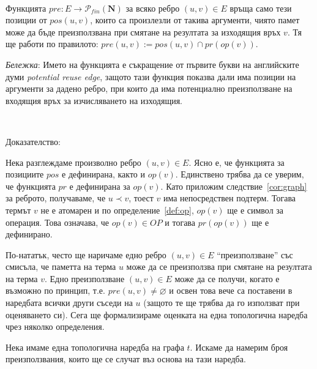 \documentclass[12pt,twoside,a4paper]{article}
\begin{document}
	\begin{definition}\label{def:pre}~\\
		\indent Функцията $pre\colon E \to \mathcal{P}_{fin}(\mathbf{N})$ за всяко ребро $(u,v) \in E$ връща само тези позиции от $pos(u,v)$, които са произлезли от такива аргументи, чиято памет може да бъде преизползвана при смятане на резултата за изходящия връх $v$. Тя ще работи по правилото: $pre(u,v) := pos(u,v) \cap pr(op(v))$.
		
		\textit{Бележка}: Името на функцията е съкращение от първите букви на английските думи \textit{potential reuse edge}, защото тази функция показва дали има позиции на аргументи за дадено ребро, при които да има потенциално преизползване на входящия връх за изчисляването на изходящия.
	\end{definition}
	
	\begin{statement}\label{stmnt:pre-corr}~
		
		\noindent Доказателство:
		
		Нека разглеждаме произволно ребро $(u,v) \in E$. Ясно е, че функцията за позициите $pos$ е дефинирана, както и $op(v)$. Единствено трябва да се уверим, че функцията $pr$ е дефинирана за $op(v)$. Като приложим следствие~\ref{cor:graph} за реброто, получаваме, че $u \prec v$, тоест $v$ има непосредствен подтерм. Тогава термът $v$ не е атомарен и по	определение~\ref{def:op}, $op(v)$ ще е символ за операция. Това означава, че $op(v) \in OP$ и тогава $pr(op(v))$ ще е дефинирано.
	\end{statement}
	
	По-нататък, често ще наричаме едно ребро $(u,v)\in E$ "`преизползване"' със смисъла, че паметта на терма $u$ може да се преизползва при смятане на резултата на терма $v$. Едно преизползване $(u,v) \in E$ може да се получи, когато е възможно по принцип, т.е. $pre(u,v) \neq \varnothing$ и освен това вече са поставени в наредбата всички други съседи на $u$ (защото те ще трябва да го използват при оценяването си). Сега ще формализираме оценката на една топологична наредба чрез няколко определения.
	
	Нека имаме една топологична наредба на графа $t$. Искаме да намерим броя преизползвания, които ще се случат въз основа на тази наредба.
	
\end{document}
